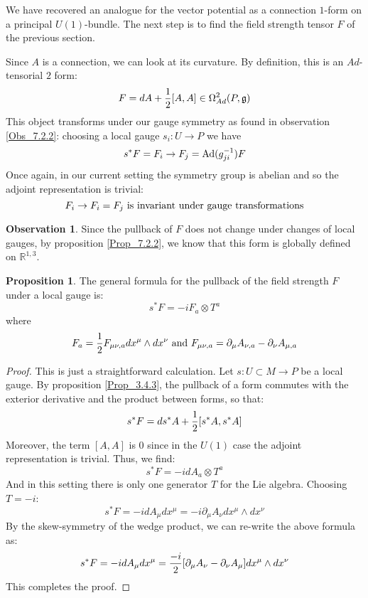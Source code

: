 \documentclass[12pt,a4paper]{report}
\theoremstyle{definition}
\theoremstyle{Theorem}
\newtheorem{Prop}[Def]{Proposition}
\theoremstyle{definition}
\theoremstyle{definition}
\newtheorem{Obs}[Def]{Observation}
\begin{document}
	We have recovered an analogue for the vector potential as a connection $1$-form on a principal $U(1)$-bundle. The next step is to find the field strength tensor $F$ of the previous section.
	\begin{comment}
		\begin{Obs}
			Since the Lie algebra is of dimension 1 there is a clear isomorphism: let $T$ be a generator for $\mathbb{R}$, then
			$$A_1\otimes T\longrightarrow A_1$$
			is a $1$-form on the manifold.
		\end{Obs}
	\end{comment}
	Since $A$ is a connection, we can look at its curvature. By definition, this is an $Ad$-tensorial $2$ form:
	$$F=dA+{1\over 2}[A,A]\in \Omega^2_{Ad}(P,\mathfrak{g})$$
	This object transforms under our gauge symmetry as found in observation \ref{Obs_7.2.2}: choosing a local gauge $s_i:U\rightarrow P$ we have
	$$s^*F=F_i\rightarrow F_j= \hbox{Ad}(g_{ji}^{-1})F$$
	Once again, in our current setting the symmetry group is abelian and so the adjoint representation is trivial:
	$$F_i\rightarrow F_i=F_j\hbox{ is invariant under gauge transformations}$$
	\begin{Obs}
		Since the pullback of $F$ does not change under changes of local gauges, by proposition \ref{Prop_7.2.2}, we know that this form is globally defined on $\mathbb{R}^{1,3}$.
	\end{Obs}
	\begin{Prop}
		The general formula for the pullback of the field strength $F$ under a local gauge is:
		$$s^*F=-iF_a\otimes T^a$$
		where
		$$F_a={1\over 2}F_{\mu\nu,a}dx^\mu\wedge dx^\nu\hbox{ and } F_{\mu\nu,a}=\partial_\mu A_{\nu,a}-\partial_\nu A_{\mu,a}$$
	\end{Prop}
	\begin{proof}
		This is just a straightforward calculation. Let $s:U\subset M\rightarrow P$ be a local gauge. By proposition \ref{Prop_3.4.3}, the pullback of a form commutes with the exterior derivative and the product between forms, so that:
		$$s^*F=ds^*A+{1\over 2}[s^*A,s^*A]$$
		Moreover, the term $[A,A]$ is 0 since in the $U(1)$ case the adjoint representation is trivial. Thus, we find:
		$$s^*F=-idA_a\otimes T^a$$
		And in this setting there is only one generator $T$ for the Lie algebra. Choosing $T=-i$:
		$$s^*F=-idA_\mu dx^\mu=-i\partial_\mu A_\nu dx^\mu\wedge dx^\nu$$
		By the skew-symmetry of the wedge product, we can re-write the above formula as:
		$$s^*F=-idA_\mu dx^\mu={-i\over 2}[\partial_\mu A_\nu-\partial_\nu A_\mu] dx^\mu\wedge dx^\nu$$
		This completes the proof.
	\end{proof}
\end{document}
